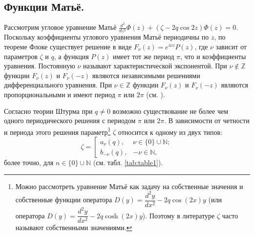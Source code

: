 \subsection{Функции Матьё.}\label{sec:ch1/sec2/sub1}
Рассмотрим угловое уравнение Матьё $\frac{d^2}{d z^2}\Phi(z) + (\zeta - 2q\cos{2 z})\Phi(z) =0$. 
Поскольку коэффициенты углового уравнения Матьё периодичны по $z$, по теореме Флоке \cite{wref2} существует решение в виде $F_\nu(z) = e^{i\nu z}P(z)$, где $\nu$ зависит от параметров $\zeta$ и $q$, а функция $P(z)$ имеет тот же период $\pi$, что и коэффициенты уравнения. Постоянную $\nu$ называют характеристической экспонентой. При $\nu \notin \mathbb{Z}$ функции $F_\nu(z)$ и $F_\nu(-z)$ являются независимыми решениями дифференциального уравнения. При $\nu \in \mathbb{Z}$ функции $F_\nu(z)$ и $F_\nu(-z)$ являются пропорциональными и имеют период $\pi$ или $2 \pi$ (см. \cite{wref2}).


Согласно теории Штурма при $q \neq 0$ возможно существование не более чем одного периодического решения с периодом $\pi$ или $2 \pi$. В зависимости от четности и периода этого решения параметр\footnote[2]{
		Можно рассмотреть уравнение Матьё как задачу на собственные значения и собственные функции оператора $D(y) = \dfrac{d^2y}{dx^2} - 2q\cos(2x) y$ (или оператора $D(y) = \dfrac{d^2y}{dx^2} - 2q\cosh(2x) y$). Поэтому в литературе  $\zeta$ часто называют собственными значениями.
}   $\zeta$ относится к одному из двух типов:
\[
\zeta = \left[
\begin{array}{cccc}
	a_\nu(q), 					& \nu \in \{0\} \cup \mathbb{N}; \\
	b_{-\nu}(q), 					& -\nu \in \mathbb{N},
\end{array}
\right.
\]
более точно, для $n\in\{0\}\cup\mathbb{N}$ (см. табл. \ref{tab:table1}).


